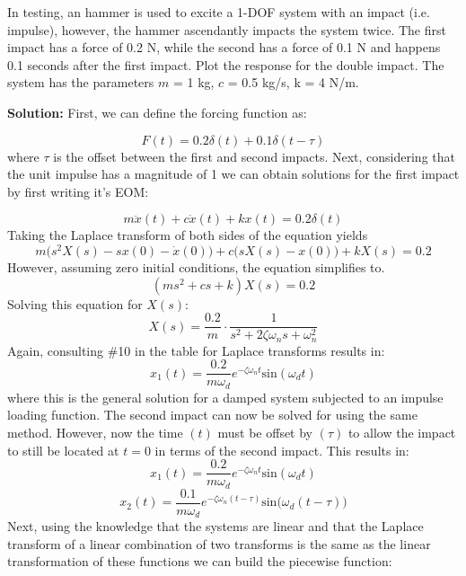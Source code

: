 \documentclass[12pt,letter]{article}
\begin{document}
\begin{example}


In testing, an hammer is used to excite a 1-DOF system with an impact (i.e. impulse), however, the hammer ascendantly impacts the system twice. The first impact has a force of 0.2 N, while the second has a force of 0.1 N and happens 0.1 seconds after the first impact. Plot the response for the double impact. The system has the parameters $m$ = 1 kg, $c$ = 0.5 kg/s, k = 4 N/m. 

\noindent\textbf{Solution:} First, we can define the forcing function as:

\begin{equation}
	F(t) = 0.2 \delta (t) + 0.1 \delta(t-\tau)
\end{equation}
where $\tau$ is the offset between the first and second impacts. Next, considering that the unit impulse has a magnitude of 1 we can obtain solutions for the first impact by first writing it's EOM:

\begin{equation}
m\ddot{x}(t) +c\dot{x}(t) +kx(t) =0.2 \delta(t)
\end{equation}
Taking the Laplace transform of both sides of the equation yields 
\begin{equation}
m\big(s^2X(s)-sx(0) - \dot{x}(0)\big) + c\big(sX(s)-x(0)\big) +kX(s) = 0.2
\end{equation}
However, assuming zero initial conditions, the equation simplifies to. 
\begin{equation}
(ms^2 + cs +k)X(s) = 0.2
\end{equation}
Solving this equation for $X(s)$:
\begin{equation}
X(s) = \frac{0.2}{m} \cdot \frac{1}{s^2 + 2 \zeta \omega_n s + \omega_n^2}
\end{equation}
Again, consulting \#10 in the table for Laplace transforms results in:
\begin{equation}
x_1(t) = \frac{0.2}{m \omega_d} e^{-\zeta \omega_n t} \text{sin}(\omega_dt)
\end{equation}
where this is the general solution for a damped system subjected to an impulse loading function. The second impact can now be solved for using the same method. However, now the time $(t)$ must be offset by $(\tau)$ to allow the impact to still be located at $t=0$ in terms of the second impact. This results in:
\begin{equation}
	x_1(t) = \frac{0.2}{m \omega_d} e^{-\zeta \omega_n t} \text{sin}(\omega_dt)
\end{equation}
\begin{equation}
	x_2(t) = \frac{0.1}{m \omega_d} e^{-\zeta \omega_n (t-\tau)} \text{sin}\big(\omega_d(t-\tau)\big)
\end{equation}
Next, using the knowledge that the systems are linear and that the Laplace transform of a linear combination of two transforms is the same as the linear transformation of these functions we can build the piecewise function:


\end{example}
\end{document}
